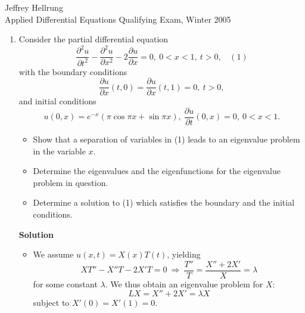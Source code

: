 \documentclass{article}
\begin{document}
\begin{flushright}
Jeffrey Hellrung \\
Applied Differential Equations Qualifying Exam, Winter 2005 \\
\end{flushright}


\begin{enumerate}

\item Consider the partial differential equation
\[\frac{\partial^2 u}{\partial t^2} - \frac{\partial^2 u}{\partial x^2} - 2 \frac{\partial u}{\partial x} = 0, \ 0 < x < 1, \ t > 0, \ \ \ \ (1)\]
with the boundary conditions
\[\frac{\partial u}{\partial x}(t,0) = \frac{\partial u}{\partial x}(t,1) = 0, \ t > 0,\]
and initial conditions
\[u(0,x) = e^{-x}(\pi \cos \pi x + \sin \pi x), \ \frac{\partial u}{\partial t}(0,x) = 0, \ 0 < x < 1.\]

\begin{itemize}
\item Show that a separation of variables in (1) leads to an eigenvalue problem in the variable \(x\).

\item Determine the eigenvalues and the eigenfunctions for the eigenvalue problem in question.

\item Determine a solution to (1) which satisfies the boundary and the initial conditions.

\end{itemize}

{\bf Solution}

\begin{itemize}
\item We assume \(u(x,t) = X(x) T(t)\), yielding
\[X T'' - X'' T - 2 X' T = 0 \ \Rightarrow \ \frac{T''}{T} = \frac{X'' + 2 X'}{X} = \lambda\]
for some constant \(\lambda\).  We thus obtain an eigenvalue problem for \(X\):
\[LX = X'' + 2 X' = \lambda X\]
subject to \(X'(0) = X'(1) = 0\).


\end{itemize}
\end{enumerate}
\end{document}
